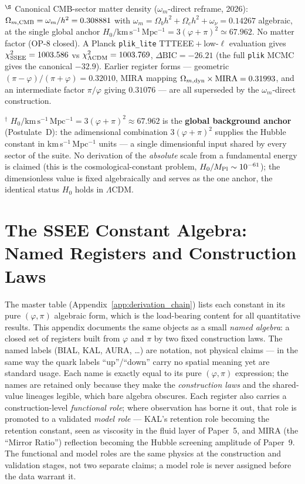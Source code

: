 \documentclass[12pt,a4paper]{article}
\newcommand{\kmsu}{\mathrm{km\,s^{-1}\,Mpc^{-1}}}
\begin{document}
\footnotesize $^\S$ Canonical CMB-sector matter density ($\omega_m$-direct reframe, 2026):
$\Omega_{m,\rm CMB}=\omega_m/h^2=0.308881$ with $\omega_m=\Omega_b h^2+\Omega_c h^2
+\omega_\nu=0.14267$ algebraic, at the single global anchor
$H_0/\kmsu=3(\varphi+\pi)^2\simeq67.962$. No matter factor (OP-8 closed). A Planck
\texttt{plik\_lite} TTTEEE${}+{}$low-$\ell$ evaluation gives $\chi^2_{\rm SSEE}=1003.586$ vs
$\chi^2_{\Lambda\rm CDM}=1003.769$, $\Delta\mathrm{BIC}=-26.21$ (the full
\texttt{plik} MCMC gives the canonical $-32.9$). Earlier register
forms --- geometric $(\pi-\varphi)/(\pi+\varphi)=0.32010$, MIRA mapping
$\Omega_{m,\rm dyn}\times\mathrm{MIRA}=0.31993$, and an intermediate factor
$\pi/\varphi$ giving $0.31076$ --- are all superseded by the $\omega_m$-direct
construction.

\footnotesize $^\dagger$ $H_0/\kmsu=3(\varphi+\pi)^2\approx67.962$
is the \textbf{global background anchor} (Postulate~D): the adimensional
combination $3(\varphi+\pi)^2$ supplies the Hubble constant in
km\,s$^{-1}$\,Mpc$^{-1}$ units --- a single dimensionful input shared by every
sector of the suite. No derivation of the \emph{absolute} scale from a
fundamental energy is claimed (this is the cosmological-constant problem,
$H_0/M_{\rm Pl}\sim10^{-61}$); the dimensionless value is fixed algebraically
and serves as the one anchor, the identical status $H_0$ holds in $\Lambda$CDM.

\section{The SSEE Constant Algebra: Named Registers and Construction Laws}
\label{app:lineage}

The master table (Appendix~\ref{app:derivation_chain}) lists each constant
in its pure $(\varphi,\pi)$ algebraic form, which is the load-bearing content
for all quantitative results. This appendix documents the same objects as a
small \emph{named algebra}: a closed set of registers built from $\varphi$ and
$\pi$ by two fixed construction laws. The named labels (BIAL, KAL, AURA,
\ldots) are notation, not physical claims --- in the same way the quark labels
``up''/``down'' carry no spatial meaning yet are standard usage. Each name is
exactly equal to its pure $(\varphi,\pi)$ expression; the names are retained
only because they make the \emph{construction laws} and the shared-value
lineages legible, which bare algebra obscures. Each register also carries a
construction-level \emph{functional role}; where observation has borne it out,
that role is promoted to a validated \emph{model role} --- KAL's retention role
becoming the retention constant, seen as viscosity in the fluid layer of Paper~5, and MIRA (the ``Mirror Ratio'')
reflection becoming the Hubble screening amplitude of Paper~9. The functional
and model roles are the same physics at the construction and validation stages,
not two separate claims; a model role is never assigned before the data warrant
it.
\end{document}

